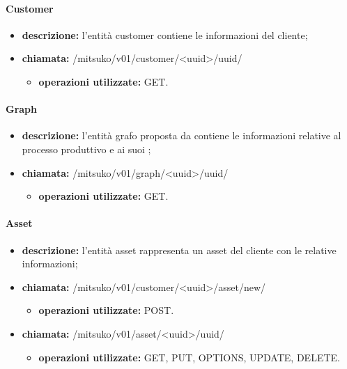 \paragraph{Customer}
\begin{itemize}
	\item \textbf{descrizione:} l'entità customer contiene le informazioni del cliente;
	\item \textbf{chiamata:} /mitsuko/v01/customer/<uuid>/uuid/
	\begin{itemize}\item \textbf{operazioni utilizzate:} GET.\end{itemize}
\end{itemize}

\paragraph{Graph}
\begin{itemize}
	\item \textbf{descrizione:} l'entità grafo proposta da \riskapp{} contiene le informazioni relative al processo produttivo e ai suoi ;
	\item \textbf{chiamata:} /mitsuko/v01/graph/<uuid>/uuid/
	\begin{itemize}\item \textbf{operazioni utilizzate:} GET.\end{itemize}
\end{itemize}

\paragraph{Asset}
\begin{itemize}
	\item \textbf{descrizione:} l'entità asset rappresenta un asset del cliente con le relative informazioni;
	\item \textbf{chiamata:} /mitsuko/v01/customer/<uuid>/asset/new/
	\begin{itemize}\item \textbf{operazioni utilizzate:} POST.\end{itemize}
	\item \textbf{chiamata:} /mitsuko/v01/asset/<uuid>/uuid/
	\begin{itemize}\item \textbf{operazioni utilizzate:} GET, PUT, OPTIONS, UPDATE, DELETE.\end{itemize}
\end{itemize}


